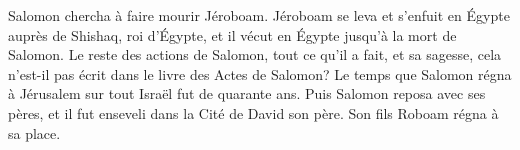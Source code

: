 Salomon chercha à faire mourir Jéroboam.
Jéroboam se leva et s’enfuit en Égypte auprès de Shishaq, roi d’Égypte,
	et il vécut en Égypte jusqu’à la mort de Salomon.
Le reste des actions de Salomon, tout ce qu’il a fait, et sa sagesse,
	cela n’est-il pas écrit dans le livre des Actes de Salomon?
Le temps que Salomon régna à Jérusalem sur tout Israël fut de quarante ans.
Puis Salomon reposa avec ses pères, et il fut enseveli dans la Cité de David son père.
	Son fils Roboam régna à sa place.
